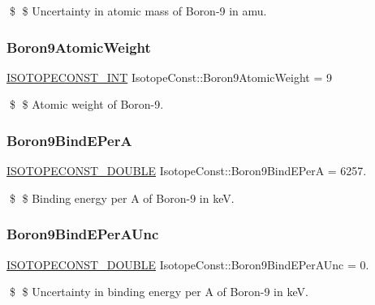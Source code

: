 \$ \$ Uncertainty in atomic mass of Boron-\/9 in amu. \mbox{\label{group___isotope_const-_boron-_b9_ga48576e89b587b9a3868266ecab8d295c}} 
\subsubsection{\texorpdfstring{Boron9\+Atomic\+Weight}{Boron9AtomicWeight}}
{\footnotesize\ttfamily \mbox{\hyperlink{group___isotope_const-_macros_ga5f18360b3e99483a35c32d789e62621c}{I\+S\+O\+T\+O\+P\+E\+C\+O\+N\+S\+T\+\_\+\+I\+NT}} Isotope\+Const\+::\+Boron9\+Atomic\+Weight = 9}

\$ \$ Atomic weight of Boron-\/9. \mbox{\label{group___isotope_const-_boron-_b9_ga6c63fe5ddc52741edb85a668c78d95b1}} 
\subsubsection{\texorpdfstring{Boron9\+Bind\+E\+PerA}{Boron9BindEPerA}}
{\footnotesize\ttfamily \mbox{\hyperlink{group___isotope_const-_macros_ga8f45a7272ce02c0b4c65c44636ed719a}{I\+S\+O\+T\+O\+P\+E\+C\+O\+N\+S\+T\+\_\+\+D\+O\+U\+B\+LE}} Isotope\+Const\+::\+Boron9\+Bind\+E\+PerA = 6257.}

\$ \$ Binding energy per A of Boron-\/9 in keV. \mbox{\label{group___isotope_const-_boron-_b9_ga420b5aa3b0eb552a9c11735f964e9f73}} 
\subsubsection{\texorpdfstring{Boron9\+Bind\+E\+Per\+A\+Unc}{Boron9BindEPerAUnc}}
{\footnotesize\ttfamily \mbox{\hyperlink{group___isotope_const-_macros_ga8f45a7272ce02c0b4c65c44636ed719a}{I\+S\+O\+T\+O\+P\+E\+C\+O\+N\+S\+T\+\_\+\+D\+O\+U\+B\+LE}} Isotope\+Const\+::\+Boron9\+Bind\+E\+Per\+A\+Unc = 0.}

\$ \$ Uncertainty in binding energy per A of Boron-\/9 in keV. \mbox{\label{group___isotope_const-_boron-_b9_ga1924a7435fc475298441d0fb01d6393d}} 
